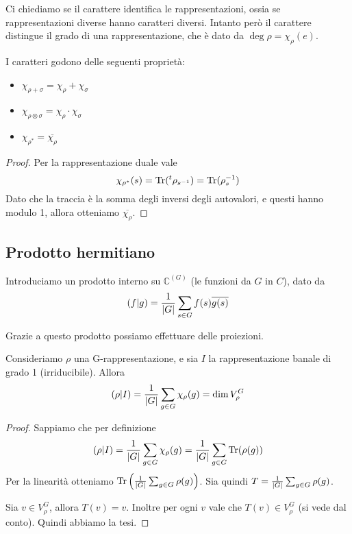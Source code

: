 \documentclass[a4paper,10pt,oneside]{math_article}
\newcommand{\herm}[2]{\left(#1 | #2\right)}
\newcommand{\id}{I}
\let\conj\overline
\begin{document}
    Ci chiediamo se il carattere identifica le rappresentazioni, ossia se rappresentazioni diverse hanno caratteri diversi.
    Intanto però il carattere distingue il grado di una rappresentazione, che è dato da $\deg \rho = \chi_\rho(e)$.
 
    \begin{mylemma}
    I caratteri godono delle seguenti proprietà:
      \begin{itemize}
      \item $\chi_{\rho+\sigma}=\chi_\rho+\chi_\sigma$     
      \item $\chi_{\rho\otimes\sigma}=\chi_\rho\cdot\chi_\sigma$
      \item $\chi_{\rho^*} = \conj{\chi_\rho}$
      \end{itemize}
    \end{mylemma}
    \begin{proof}
     Per la rappresentazione duale vale 
     \[
      \chi_{\rho^*}(s)=\operatorname{Tr} (\prescript{t}{}{\rho}_{s^{-1}})=\operatorname{Tr} (\rho_s^{-1})
     \]
     Dato che la traccia è la somma degli inversi degli autovalori, e questi hanno modulo 1, allora otteniamo $\conj{\chi_\rho}$. 

    \end{proof}

    
    \subsection{Prodotto hermitiano}
    Introduciamo un prodotto interno su $\mathbb C^{(G)}$ (le funzioni da $G$ in $C$), dato da 
    \[
     \herm fg = \frac 1{\abs G} \sum_{s\in G} f(s)\conj{g(s)}
    \]
    
    Grazie a questo prodotto possiamo effettuare delle proiezioni.
    
    \begin{mylemma}
     Consideriamo $\rho$ una G-rappresentazione, e sia $\id$ la rappresentazione banale di grado 1 (irriducibile). Allora 
     \[
      \herm \rho\id = \frac 1{\abs G}\sum_{g\in G} \chi_\rho(g) = \dim V_\rho^G
     \]    
    \end{mylemma}
    \begin{proof}
     Sappiamo che per definizione
     \[
      \herm \rho\id = \frac 1{\abs G}\sum_{g\in G} \chi_\rho(g) = \frac 1{\abs G}\sum_{g\in G} \Tr(\rho(g)) 
     \]
     Per la linearità otteniamo $\operatorname{Tr}\left(\frac 1{\left|G\right|}\sum_{g\in G}\rho(g)\right)$. Sia quindi $T=\frac 1{\left|G\right|}\sum_{g\in G}\rho(g)$.
     
     Sia $v \in V^G_\rho$, allora $T(v)=v$. Inoltre per ogni $v$ vale che $T(v) \in V^G_\rho$ (si vede dal conto). Quindi abbiamo la tesi.
     
    \end{proof}
    
\end{document}

